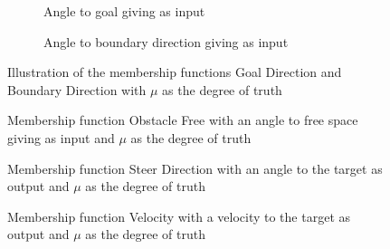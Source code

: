 \documentclass[../Head/Main.tex]{subfiles}
\begin{document}
\begin{figure}[H]
	\centering
	\begin{subfigure}[b]{0.49\textwidth}
		\centering
		
		\caption{Angle to goal giving as input}
		\label{fig:MSF_Goal_direction}
	\end{subfigure}
	\hfill
	\begin{subfigure}[b]{0.49\textwidth}
		
		\caption{Angle to boundary direction giving as input}
		\label{fig:MSF_Boundary_direction}
	\end{subfigure}
	\caption{Illustration of the membership functions Goal Direction and Boundary Direction with $\mu$ as the degree of truth}
	\label{fig:MSF_Goal_boundary}
\end{figure}

\begin{figure}[H]
	\centering
	
	\caption{Membership function Obstacle Free with an angle to free space giving as input and  $\mu$ as the degree of truth}
	\label{fig:MSF_Obstacle_free}
\end{figure}

\begin{figure}[H]
	\centering
	
	\caption{Membership function Steer Direction with an angle to the target as output and $\mu$ as the degree of truth}
	\label{fig:MSF_Steer_direction}
\end{figure}

\begin{figure}[H]
	\centering
	
	\caption{Membership function Velocity with a velocity to the target as output and $\mu$ as the degree of truth}
	\label{fig:MSF_Velocity}
\end{figure}
\end{document}
